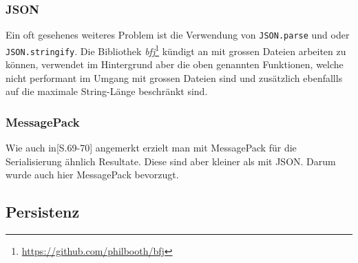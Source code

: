 



\subsubsection{JSON}

Ein oft gesehenes weiteres Problem ist die Verwendung von \texttt{JSON\-.parse} und oder \texttt{JSON.stringify}.
Die Bibliothek \textit{bfj}\footnote{\url{https://github.com/philbooth/bfj}} kündigt an mit grossen Dateien arbeiten zu können, verwendet im Hintergrund aber die oben genannten Funktionen, welche nicht performant im Umgang mit grossen Dateien sind und zusätzlich ebenfallls auf die maximale String-Länge beschränkt sind.

\subsubsection{MessagePack}

Wie auch in\cite{msgpack-conf}[S.69-70] angemerkt erzielt man mit MessagePack für die Serialisierung ähnlich Resultate. Diese sind aber kleiner als mit JSON. Darum wurde auch hier MessagePack bevorzugt.


\subsection{Persistenz}

